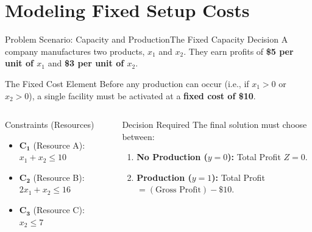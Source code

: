 \documentclass[aspectratio=169]{beamer}
\begin{document}
\section{Modeling Fixed Setup Costs}
\begin{frame}\sectionpage\end{frame}

\begin{frame}{Problem Scenario: Capacity and Production}{The Fixed Capacity Decision}
    A company manufactures two products, $x_1$ and $x_2$. They earn profits of \textbf{\$5 per unit of $x_1$} and \textbf{\$3 per unit of $x_2$}.

    \begin{block}{The Fixed Cost Element}
        Before any production can occur (i.e., if $x_1 > 0$ or $x_2 > 0$), a single facility must be activated at a \alert{\textbf{fixed cost of \$10}}.
    \end{block}

    \begin{columns}[T]
        \begin{column}{0.48\textwidth}
            \begin{block}{Constraints (Resources)}
                \begin{itemize}
                    \item $\mathbf{C_1}$ (Resource A): $x_1 + x_2 \le 10$
                    \item $\mathbf{C_2}$ (Resource B): $2x_1 + x_2 \le 16$
                    \item $\mathbf{C_3}$ (Resource C): $x_2 \le 7$
                \end{itemize}
            \end{block}
        \end{column}
        \begin{column}{0.48\textwidth}
            \begin{block}{Decision Required}
                The final solution must choose between:
                \begin{enumerate}
                    \item \textbf{No Production ($y=0$):} Total Profit $Z=0$.
                    \item \textbf{Production ($y=1$):} Total Profit $= (\text{Gross Profit}) - \$10$.
                \end{enumerate}
            \end{block}
        \end{column}
    \end{columns}
\end{frame}
\end{document}
